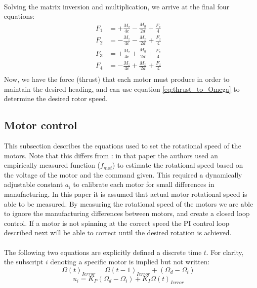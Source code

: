 \documentclass{article}
\numberwithin{equation}{section} %
\begin{document}
\\
Solving the matrix inversion and multiplication, we arrive at the final four equations:
\begin{align}
F_1 &= +\frac{M_z}{4c} - \frac{M_y}{2d} + \frac{F_z}{4} \\
F_2 &= -\frac{M_z}{4c} - \frac{M_x}{2d} + \frac{F_z}{4} \\
F_3 &= +\frac{M_z}{4c} + \frac{M_y}{2d} + \frac{F_z}{4} \\
F_4 &= -\frac{M_z}{4c} + \frac{M_x}{2d} + \frac{F_z}{4} \\
\end{align}
Now, we have the force (thrust) that each motor must produce in order to maintain the desired heading, and can use equation \eqref{eq:thrust_to_Omega} to determine the desired rotor speed.


\subsection{Motor control} \label{subsec:motorcontrol}

This subsection describes the equations used to set the rotational speed of the motors. Note that this differs from \cite{stingu09}: in that paper the authors used an empirically measured function ($f_{mot}$) to estimate the rotational speed based on the voltage of the motor and the command given. This required a dynamically adjustable constant $a_i$ to calibrate each motor for small differences in manufacturing. In this paper it is assumed that actual motor rotational speed is able to be measured. By measuring the rotational speed of the motors we are able to ignore the manufacturing differences between motors, and create a closed loop control. If a motor is not spinning at the correct speed the PI control loop described next will be able to correct until the desired rotation is achieved.
\\ \\
The following two equations are explicitly defined a discrete time $t$. For clarity, the subscript $i$ denoting a specific motor is implied but not written:
\begin{equation}
	\Omega \left(t \right)_{ Ierror} = \Omega \left(t-1 \right)_{ Ierror} + \left( \Omega_{d} - \Omega_i \right)
\end{equation}
\begin{equation}
	u_i = K_{P} \left( \Omega_{d} - \Omega_i \right) + K_{I} \Omega \left(t \right) _{Ierror}
\end{equation}
\end{document}
